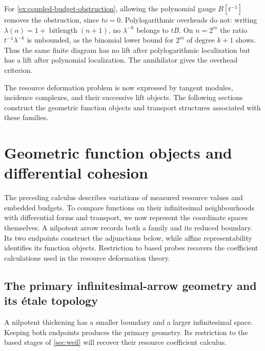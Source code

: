 \documentclass[11pt,a4paper]{article}
\numberwithin{algorithm}{section}
\numberwithin{equation}{section}
\theoremstyle{definition}
\theoremstyle{remark}
\theoremstyle{plain}
\theoremstyle{definition}
\theoremstyle{plain}
\begin{document}
For \cref{ex:coupled-budget-obstruction}, allowing the polynomial gauge
$B[t^{-1}]$ removes the obstruction, since $to=0$. Polylogarithmic
overheads do not: writing $\lambda(n)=1+\operatorname{bitlength}(n+1)$,
no $\lambda^{-k}$ belongs to $tB$. On $n=2^m$ the ratio
$t^{-1}\lambda^{-k}$ is unbounded, as the binomial lower bound for
$2^m$ of degree $k+1$ shows. Thus the same finite diagram has no lift
after polylogarithmic localization but has a lift after polynomial
localization. The annihilator gives the overhead criterion.


The resource deformation problem is now expressed by tangent modules,
incidence complexes, and their successive lift objects. The following
sections construct the geometric function objects and transport
structures associated with these families.

\section{Geometric function objects and differential cohesion}
\label{sec:primary-geometry}
The preceding calculus describes variations of measured resource values
and embedded budgets. To compare functions on their infinitesimal
neighbourhoods with differential forms and transport, we now represent
the coordinate spaces themselves. A nilpotent arrow records both a
family and its reduced boundary. Its two endpoints construct the
adjunctions below, while affine representability identifies its
function objects. Restriction to based probes recovers the coefficient
calculations used in the resource deformation theory.

\subsection{The primary infinitesimal-arrow geometry and its \texorpdfstring{\'etale}{etale} topology}
\label{sec:etale-infinitesimal-site}
A nilpotent thickening has a smaller boundary and a larger
infinitesimal space. Keeping both endpoints produces the primary
geometry. Its restriction to the based stages of \cref{sec:weil}
will recover their resource coefficient calculus.
\end{document}

